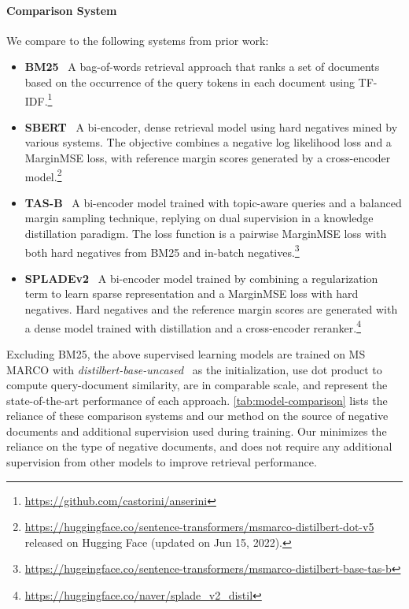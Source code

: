 \documentclass{article}
\begin{document}
\paragraph{Comparison System} We compare to the following systems from prior work: 
\begin{itemize}
    \item \textbf{BM25}~\citep{Robertson2009ThePR} A bag-of-words retrieval approach that ranks a set of documents based on the occurrence of the query tokens in each document using TF-IDF.\footnote{\url{https://github.com/castorini/anserini}} 
    
   
    \item \textbf{SBERT}~\citep{reimers-2019-sentence-bert} A bi-encoder, dense retrieval model using hard negatives mined by various systems. The objective combines a negative log likelihood loss and a MarginMSE loss, with reference margin scores generated by a cross-encoder model.\footnote{\url{https://huggingface.co/sentence-transformers/msmarco-distilbert-dot-v5} released on Hugging Face (updated on Jun 15, 2022).} 
    
    \item \textbf{TAS-B}~\citep{Hofsttter2021EfficientlyTA} A bi-encoder model trained with topic-aware queries and a balanced margin sampling technique, replying on dual supervision in a knowledge distillation paradigm. The loss function is a pairwise MarginMSE loss with both hard negatives from BM25 and in-batch negatives.\footnote{\url{https://huggingface.co/sentence-transformers/msmarco-distilbert-base-tas-b}}
    
    \item \textbf{SPLADEv2}~\citep{Formal2021SPLADEVS} A bi-encoder model trained by combining a regularization term to learn sparse representation and a MarginMSE loss with hard negatives. Hard negatives and the reference margin scores are generated with a dense model trained with distillation and a cross-encoder reranker.\footnote{\url{https://huggingface.co/naver/splade_v2_distil}}
\end{itemize}
Excluding BM25, the above supervised learning models are trained on MS MARCO with \textit{distilbert-base-uncased}~\citep{Sanh2019DistilBERTAD} as the initialization,  use dot product to compute query-document similarity, are in comparable scale, and represent the state-of-the-art performance of each approach. \autoref{tab:model-comparison} lists the reliance of these comparison systems and our method on the source of negative documents and additional supervision used during training. Our \alg{} minimizes the reliance on the type of negative documents, and does not require any additional supervision from other models to improve retrieval performance.
\end{document}
